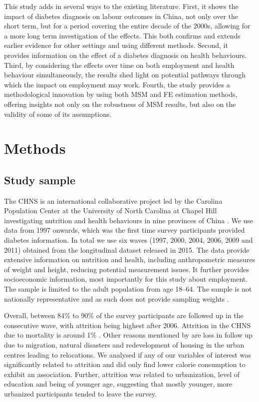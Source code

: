 This study adds in several ways to the existing literature. First, it shows the impact of diabetes diagnosis on labour outcomes in China, not only over the short term, but for a period covering the entire decade of the 2000s, allowing for a more long term investigation of the effects. This both confirms and extends earlier evidence for other settings and using different methods. Second, it provides information on the effect of a diabetes diagnosis on health behaviours. Third, by considering the effects over time on both employment and health behaviour simultaneously, the results shed light on potential pathways through which the impact on employment may work.  Fourth, the study provides a methodological innovation by using both \ac{MSM} and \ac{FE} estimation methods, offering insights not only on the robustness of \ac{MSM} results, but also on the validity of some of its assumptions.  


\section{\label{sec:Methods5}Methods}

\subsection{Study sample}


The \ac{CHNS} is an international collaborative project led by the Carolina Population Center at the University of North Carolina at Chapel Hill investigating nutrition and health behaviours in nine provinces of China \parencite{Zhang2014d}. We use data from 1997 onwards, which was the first time survey participants provided diabetes information. In total we use six waves (1997, 2000, 2004, 2006, 2009 and 2011) obtained from the longitudinal dataset released in 2015. The data provide extensive information on nutrition and health, including anthropometric measures of weight and height, reducing potential measurement issues. It further provides socioeconomic information, most importantly for this study about employment. The sample is limited to the adult population from age 18--64.  The sample is not nationally representative and as such does not provide sampling weights  \parencite{Popkin2010}.

Overall, between 84\% to 90\% of the survey participants are followed up in the consecutive wave, with attrition being highest after 2006. Attrition in the \ac{CHNS} due to mortality is around 1\% \parencite{Popkin2010}. Other reasons mentioned by \textcite{Popkin2010} are loss in follow up due to migration, natural disasters and redevelopment of housing in the urban centres leading to relocations. We analysed if any of our variables of interest was significantly related to attrition and did only find lower calorie consumption to exhibit an association. Further, attrition was related to urbanization, level of education and being of younger age, suggesting that mostly younger, more urbanized participants tended to leave the survey. 


